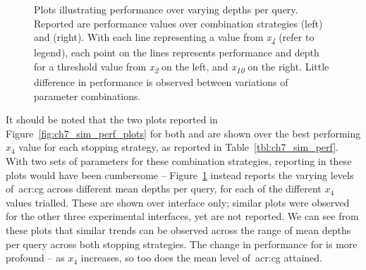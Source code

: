 \begin{figure}[t!]
    \centering
    \caption[Performance over combination stopping strategies]{Plots illustrating performance over varying depths per query. Reported are performance values over combination strategies  (left) and  (right). With each line representing a value from \emph{x\textsubscript{4}} (refer to legend), each point on the lines represents performance and depth for a threshold value from \emph{x\textsubscript{2}} on the left, and \emph{x\textsubscript{10}} on the right. Little difference in performance is observed between variations of parameter combinations.}
    \label{fig:ch7_sim_perf_plots_combo}
\end{figure}

It should be noted that the two plots reported in Figure~\ref{fig:ch7_sim_perf_plots} for both  and  are shown over the best performing $x_4$ value for each stopping strategy, as reported in Table~\ref{tbl:ch7_sim_perf}. With two sets of parameters for these combination strategies, reporting in these plots would have been cumbersome -- Figure~\ref{fig:ch7_sim_perf_plots_combo} instead reports the varying levels of~\gls{acr:cg} across different mean depths per query, for each of the different $x_4$ values trialled. These are shown over interface  only; similar plots were observed for the other three experimental interfaces, yet are not reported. We can see from these plots that similar trends can be observed across the range of mean depths per query across both stopping strategies. The change in performance for  is more profound -- as $x_4$ increases, so too does the mean level of~\gls{acr:cg} attained.

